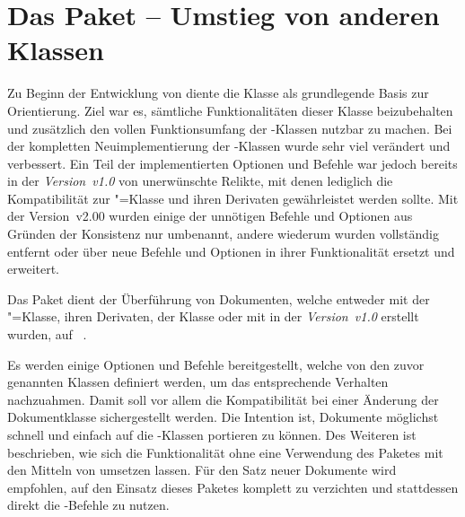 \section{Das Paket  -- Umstieg von anderen Klassen}
\begin{Bundle*}{}
%
%

\noindent{}

\bigskip\noindent
Zu Beginn der Entwicklung von \TUDScript diente die Klasse  als 
grundlegende Basis zur Orientierung. Ziel war es, sämtliche Funktionalitäten 
dieser Klasse beizubehalten und zusätzlich den vollen Funktionsumfang der 
\KOMAScript-Klassen nutzbar zu machen. Bei der kompletten Neuimplementierung 
der \TUDScript-Klassen wurde sehr viel verändert und verbessert. Ein Teil der 
implementierten Optionen und Befehle war jedoch bereits in der 
\emph{Version~v1.0} von \TUDScript unerwünschte Relikte, mit denen lediglich 
die Kompatibilität zur "=Klasse und ihren Derivaten 
gewährleistet werden sollte. Mit der Version~v2.00 wurden einige der unnötigen 
Befehle und Optionen aus Gründen der Konsistenz nur umbenannt, andere wiederum 
wurden vollständig entfernt oder über neue Befehle und Optionen in ihrer 
Funktionalität ersetzt und erweitert. 

Das Paket  dient der Überführung von Dokumenten, welche
entweder mit der "=Klasse, ihren Derivaten, 
der Klasse  oder mit \TUDScript in der \emph{Version~v1.0} 
erstellt wurden, auf \TUDScript~\vTUDScript. 

Es werden einige Optionen und Befehle bereitgestellt, welche von den zuvor 
genannten Klassen definiert werden, um das entsprechende Verhalten nachzuahmen. 
Damit soll vor allem die Kompatibilität bei einer Änderung der Dokumentklasse 
sichergestellt werden. Die Intention ist, Dokumente möglichst schnell und 
einfach auf die \TUDScript-Klassen portieren zu können. Des Weiteren ist 
beschrieben, wie sich die Funktionalität ohne eine Verwendung des Paketes 
 mit den Mitteln von \TUDScript umsetzen lassen. Für den 
Satz neuer Dokumente wird empfohlen, auf den Einsatz dieses Paketes komplett zu 
verzichten und stattdessen direkt die \TUDScript-Befehle zu nutzen.


\end{Bundle*}
